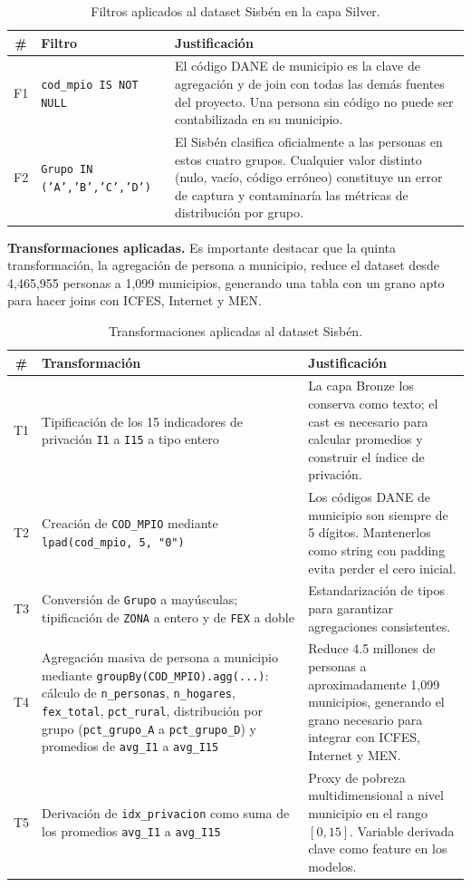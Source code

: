 \begin{table}[H]
\centering
\caption{Filtros aplicados al dataset Sisbén en la capa Silver.}
\begin{tabularx}{\textwidth}{c l X}
\toprule
\textbf{\#} & \textbf{Filtro} & \textbf{Justificación} \\
\midrule
F1 & \texttt{cod\_mpio IS NOT NULL} & El código DANE de municipio es la clave de agregación y de join con todas las demás fuentes del proyecto. Una persona sin código no puede ser contabilizada en su municipio. \\
F2 & \texttt{Grupo IN ('A','B','C','D')} & El Sisbén clasifica oficialmente a las personas en estos cuatro grupos. Cualquier valor distinto (nulo, vacío, código erróneo) constituye un error de captura y contaminaría las métricas de distribución por grupo. \\
\bottomrule
\end{tabularx}
\end{table}

\textbf{Transformaciones aplicadas.} Es importante destacar que la quinta transformación, la agregación de persona a municipio, reduce el dataset desde 4,465,955 personas a 1,099 municipios, generando una tabla con un grano apto para hacer joins con ICFES, Internet y MEN.

\begin{table}[H]
\centering
\caption{Transformaciones aplicadas al dataset Sisbén.}
\begin{tabularx}{\textwidth}{c l X}
\toprule
\textbf{\#} & \textbf{Transformación} & \textbf{Justificación} \\
\midrule
T1 & Tipificación de los 15 indicadores de privación \texttt{I1} a \texttt{I15} a tipo entero & La capa Bronze los conserva como texto; el cast es necesario para calcular promedios y construir el índice de privación. \\
T2 & Creación de \texttt{COD\_MPIO} mediante \texttt{lpad(cod\_mpio, 5, "0")} & Los códigos DANE de municipio son siempre de 5 dígitos. Mantenerlos como string con padding evita perder el cero inicial. \\
T3 & Conversión de \texttt{Grupo} a mayúsculas; tipificación de \texttt{ZONA} a entero y de \texttt{FEX} a doble & Estandarización de tipos para garantizar agregaciones consistentes. \\
T4 & Agregación masiva de persona a municipio mediante \texttt{groupBy(COD\_MPIO).agg(...)}: cálculo de \texttt{n\_personas}, \texttt{n\_hogares}, \texttt{fex\_total}, \texttt{pct\_rural}, distribución por grupo (\texttt{pct\_grupo\_A} a \texttt{pct\_grupo\_D}) y promedios de \texttt{avg\_I1} a \texttt{avg\_I15} & Reduce 4.5 millones de personas a aproximadamente 1,099 municipios, generando el grano necesario para integrar con ICFES, Internet y MEN. \\
T5 & Derivación de \texttt{idx\_privacion} como suma de los promedios \texttt{avg\_I1} a \texttt{avg\_I15} & Proxy de pobreza multidimensional a nivel municipio en el rango $[0, 15]$. Variable derivada clave como feature en los modelos. \\
\bottomrule
\end{tabularx}
\end{table}

